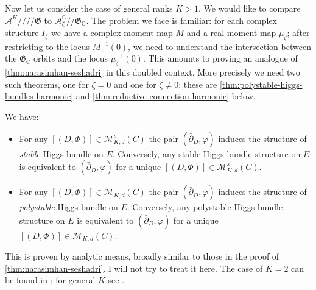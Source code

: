 \documentclass[12pt,letterpaper,reqno]{article}
\numberwithin{equation}{section}
\newcommand{\fG}{{\mathfrak G}}
\newcommand{\cM}{\ensuremath{\mathcal M}}
\newcommand{\cA}{\ensuremath{\mathcal A}}
\newcommand{\C}{\ensuremath{\mathbb C}}
\newcommand{\kq}{/\!\!/}
\newcommand{\hkq}{/\!\!/\!\!/\!\!/}
\newcommand{\ti}[1]{\textit{#1}}
\begin{document}
Now let us consider the case of general ranks $K>1$. We would like
to compare $\cA^H \hkq \fG$ to $\cA_\zeta^\C \kq \fG_\C$.
The problem we face is familiar: for each complex structure $I_\zeta$
we have a complex moment map $M$ and a real moment map $\mu_\zeta$;
after restricting to the locus $M^{-1}(0)$, 
we need to understand the intersection
between the $\fG_\C$ orbits and the locus $\mu_\zeta^{-1}(0)$.
This amounts to proving an analogue of \autoref{thm:narasimhan-seshadri}
in this doubled context. More precisely we need two such theorems,
one for $\zeta = 0$ and one for $\zeta \neq 0$:
these are \autoref{thm:polystable-higgs-bundles-harmonic}
and \autoref{thm:reductive-connection-harmonic} below.

\begin{thm} \label{thm:polystable-higgs-bundles-harmonic}
We have:
\begin{itemize}
\item For any $[(D,\Phi)] \in \cM^s_{K,d}(C)$ the pair
$(\bar\partial_D,\varphi)$
induces the structure of \ti{stable} Higgs bundle on $E$.
Conversely, any stable Higgs bundle structure 
on $E$ is equivalent to $(\bar\partial_D,\varphi)$ for a unique $[(D,\Phi)] \in \cM^s_{K,d}(C)$.
\item For any $[(D,\Phi)] \in \cM_{K,d}(C)$ the pair
$(\bar\partial_D,\varphi)$
induces the structure of \ti{polystable} Higgs bundle on $E$.
Conversely, any polystable Higgs bundle structure 
on $E$ is equivalent to $(\bar\partial_D,\varphi)$ for a unique $[(D,\Phi)] \in \cM_{K,d}(C)$.
\end{itemize}
\end{thm}

\begin{pf} This is proven by analytic means, broadly similar to those
 in the proof of \autoref{thm:narasimhan-seshadri}. I will not 
 try to treat it here. The case of $K=2$
 can be found in \cite{MR89a:32021}; for general $K$ see \cite{MR944577}.
\end{pf}
\end{document}
